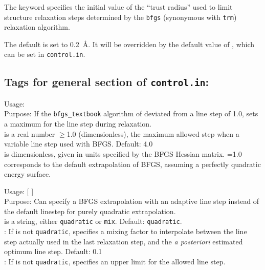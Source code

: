The keyword specifies the initial value of the ``trust radius'' used
to limit structure relaxation steps determined by the \texttt{bfgs}
(synonymous with \texttt{trm}) relaxation algorithm.

The default is set to 0.2~{\AA}. It will be overridden by the default
value of , which can be set in
\texttt{control.in}. 

\newpage

\subsection*{Tags for general section of \texttt{control.in}:}


{
  \noindent
  Usage:   \\[1.0ex]
  Purpose: If the \texttt{bfgs\_textbook} algorithm of 
    deviated from a line step of 1.0, sets a maximum for the line step
    during relaxation. \\[1.0ex] 
   is a real number $\ge$1.0 (dimensionless), the
    maximum allowed step when a variable line step used with
    BFGS. Default: 4.0 \\
}
 is dimensionless, given in units specified by the BFGS
Hessian matrix. =1.0 corresponds to the default
extrapolation of BFGS, assuming a perfectly quadratic energy surface.


{  

  \noindent
  Usage:   [ ] \\[1.0ex]
  Purpose: Can specify a BFGS extrapolation with an adaptive line
    step instead of the default linestep for purely quadratic
    extrapolation. \\[1.0ex]
   is a string, either \texttt{quadratic} or
  \texttt{mix}. Default: \texttt{quadratic}. \\
   : If  is not \texttt{quadratic},
    specifies a mixing factor to interpolate between the line step
    actually used in the last relaxation step, and the \emph{a
    posteriori} estimated optimum line step. Default: 0.1 \\
   : If  is not \texttt{quadratic},
    specifies an upper limit for the allowed line step. \\
}

